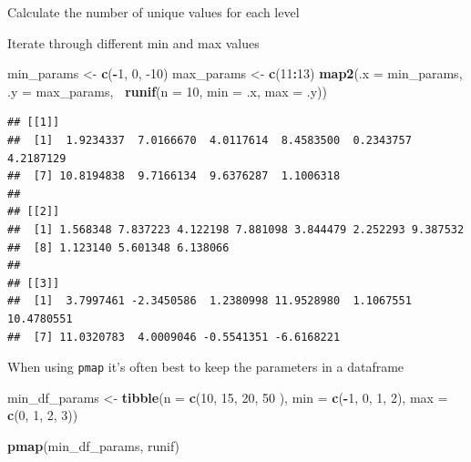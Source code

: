 \documentclass[]{book}
\newenvironment{Shaded}{\begin{snugshade}}{\end{snugshade}}
\newcommand{\DataTypeTok}[1]{\textcolor[rgb]{0.13,0.29,0.53}{#1}}
\newcommand{\DecValTok}[1]{\textcolor[rgb]{0.00,0.00,0.81}{#1}}
\newcommand{\KeywordTok}[1]{\textcolor[rgb]{0.13,0.29,0.53}{\textbf{#1}}}
\newcommand{\NormalTok}[1]{#1}
\newcommand{\OperatorTok}[1]{\textcolor[rgb]{0.81,0.36,0.00}{\textbf{#1}}}
\newcommand{\StringTok}[1]{\textcolor[rgb]{0.31,0.60,0.02}{#1}}
\theoremstyle{definition}
\theoremstyle{definition}
\theoremstyle{definition}
\theoremstyle{remark}
\begin{document}
Calculate the number of unique values for each level

\begin{Shaded}
\end{Shaded}

Iterate through different min and max values

\begin{Shaded}
\begin{Highlighting}[]
\NormalTok{min_params <-}\StringTok{ }\KeywordTok{c}\NormalTok{(}\OperatorTok{-}\DecValTok{1}\NormalTok{, }\DecValTok{0}\NormalTok{, }\DecValTok{-10}\NormalTok{)}
\NormalTok{max_params <-}\StringTok{ }\KeywordTok{c}\NormalTok{(}\DecValTok{11}\OperatorTok{:}\DecValTok{13}\NormalTok{)}
\KeywordTok{map2}\NormalTok{(}\DataTypeTok{.x =}\NormalTok{ min_params, }\DataTypeTok{.y =}\NormalTok{ max_params, }\OperatorTok{~}\KeywordTok{runif}\NormalTok{(}\DataTypeTok{n =} \DecValTok{10}\NormalTok{, }\DataTypeTok{min =}\NormalTok{ .x, }\DataTypeTok{max =}\NormalTok{ .y))}
\end{Highlighting}
\end{Shaded}

\begin{verbatim}
## [[1]]
##  [1]  1.9234337  7.0166670  4.0117614  8.4583500  0.2343757  4.2187129
##  [7] 10.8194838  9.7166134  9.6376287  1.1006318
## 
## [[2]]
##  [1] 1.568348 7.837223 4.122198 7.881098 3.844479 2.252293 9.387532
##  [8] 1.123140 5.601348 6.138066
## 
## [[3]]
##  [1]  3.7997461 -2.3450586  1.2380998 11.9528980  1.1067551 10.4780551
##  [7] 11.0320783  4.0009046 -0.5541351 -6.6168221
\end{verbatim}

When using \texttt{pmap} it's often best to keep the parameters in a
dataframe

\begin{Shaded}
\begin{Highlighting}[]
\NormalTok{min_df_params <-}\StringTok{ }\KeywordTok{tibble}\NormalTok{(}\DataTypeTok{n =} \KeywordTok{c}\NormalTok{(}\DecValTok{10}\NormalTok{, }\DecValTok{15}\NormalTok{, }\DecValTok{20}\NormalTok{, }\DecValTok{50}\NormalTok{ ), }
                        \DataTypeTok{min =} \KeywordTok{c}\NormalTok{(}\OperatorTok{-}\DecValTok{1}\NormalTok{, }\DecValTok{0}\NormalTok{, }\DecValTok{1}\NormalTok{, }\DecValTok{2}\NormalTok{), }
                        \DataTypeTok{max =} \KeywordTok{c}\NormalTok{(}\DecValTok{0}\NormalTok{, }\DecValTok{1}\NormalTok{, }\DecValTok{2}\NormalTok{, }\DecValTok{3}\NormalTok{))}

\KeywordTok{pmap}\NormalTok{(min_df_params, runif)}
\end{Highlighting}
\end{Shaded}
\end{document}
